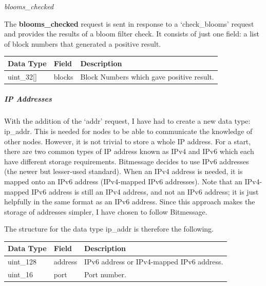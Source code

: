 \documentclass{article}
\begin{document}
\begin{center}
    \Large \textit{blooms\_checked}
\end{center}
The \textbf{blooms\_checked} request is sent in response to a `check\_blooms' request and provides the results of a bloom filter check. It consists of just one field: a list of block numbers that generated a positive result.
\begin{table}[H]
\centering
\begin{tabular}{|p{2.2cm}|p{3cm}|p{5.5cm}|}
\hline
\rowcolor{tblgrey}
Data Type   & Field       & Description\\ \hline
uint\_32[\hspace{0.05cm}] & blocks  & Block Numbers which gave positive result.       \\ \hline
\end{tabular}
\end{table}



\subparagraph{IP Addresses}With the addition of the `addr' request, I have had to create a new data type: ip\_addr. This is needed for nodes to be able to communicate the knowledge of other nodes. However, it is not trivial to store a whole IP address. For a start, there are two common types of IP address known as IPv4 and IPv6 which each have different storage requirements. Bitmessage decides to use IPv6 addresses (the newer but lesser-used standard). When an IPv4 address is needed, it is mapped onto an IPv6 address (IPv4-mapped IPv6 addresses). Note that an IPv4-mapped IPv6 address is still an IPv4 address, and not an IPv6 address; it is just helpfully in the same format as an IPv6 address. Since this approach makes the storage of addresses simpler, I have chosen to follow Bitmessage.

The structure for the data type ip\_addr is therefore the following.
\begin{table}[H]
\centering
\begin{tabular}{|p{2.2cm}|p{3cm}|p{5.5cm}|}
\hline
\rowcolor{tblgrey}
Data Type   & Field       & Description\\ \hline
uint\_128   & address     & IPv6 address or IPv4-mapped IPv6 address.                    \\ \hline
uint\_16    & port        & Port number.                                                 \\ \hline
\end{tabular}
\end{table}
\end{document}
